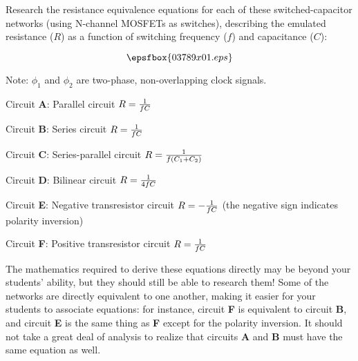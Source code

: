 

Research the resistance equivalence equations for each of these switched-capacitor networks (using N-channel MOSFETs as switches), describing the emulated resistance ($R$) as a function of switching frequency ($f$) and capacitance ($C$):

$$\epsfbox{03789x01.eps}$$

Note: $\phi_1$ and $\phi_2$ are two-phase, non-overlapping clock signals.

\vskip 10pt







Circuit {\bf A}: Parallel circuit \hskip 10pt $R = {1 \over {fC}}$

\vskip 20pt

Circuit {\bf B}: Series circuit \hskip 10pt $R = {1 \over {fC}}$ 

\vskip 20pt

Circuit {\bf C}: Series-parallel circuit \hskip 10pt $R = {1 \over {f(C_1 + C_2)}}$ 

\vskip 20pt

Circuit {\bf D}: Bilinear circuit \hskip 10pt $R = {1 \over {4fC}}$ 

\vskip 20pt

Circuit {\bf E}: Negative transresistor circuit \hskip 10pt $R = - {1 \over {fC}}$ (the negative sign indicates polarity inversion)

\vskip 20pt

Circuit {\bf F}:  Positive transresistor circuit \hskip 10pt $R = {1 \over {fC}}$ 







The mathematics required to derive these equations directly may be beyond your students' ability, but they should still be able to research them!  Some of the networks are directly equivalent to one another, making it easier for your students to associate equations: for instance, circuit {\bf F} is equivalent to circuit {\bf B}, and circuit {\bf E} is the same thing as {\bf F} except for the polarity inversion.  It should not take a great deal of analysis to realize that circuits {\bf A} and {\bf B} must have the same equation as well.




